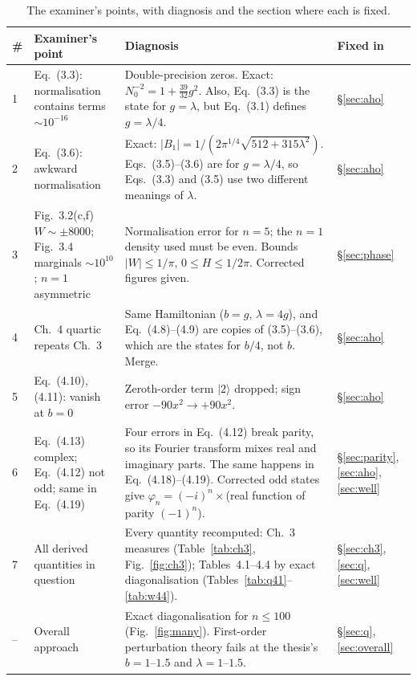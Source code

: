 \documentclass[11pt,a4paper]{article}
\newcommand{\Eq}[1]{Eq.~(#1)}
\newcommand{\ket}[1]{|#1\rangle}
\begin{document}
\begin{table}[h]
\centering\small
\begin{tabular}{@{}p{0.6cm}p{4.6cm}p{6.4cm}p{1.7cm}@{}}
\toprule
\# & Examiner's point & Diagnosis & Fixed in\\
\midrule
1 & \Eq{3.3}: normalisation contains terms $\sim10^{-16}$ &
Double-precision zeros. Exact: $N_0^{-2}=1+\tfrac{39}{32}g^2$. Also, \Eq{3.3} is the state for
$g=\lambda$, but \Eq{3.1} defines $g=\lambda/4$. & \S\ref{sec:aho}\\
2 & \Eq{3.6}: awkward normalisation &
Exact: $|B_1|=1/(2\pi^{1/4}\sqrt{512+315\lambda^2})$. Eqs.~(3.5)--(3.6) are for $g=\lambda/4$, so
Eqs.~(3.3) and (3.5) use two different meanings of $\lambda$. & \S\ref{sec:aho}\\
3 & Fig.~3.2(c,f) $W\sim\pm8000$; Fig.~3.4 marginals $\sim10^{10}$; $n=1$ asymmetric &
Normalisation error for $n=5$; the $n=1$ density used must be even. Bounds $|W|\le1/\pi$,
$0\le H\le1/2\pi$. Corrected figures given. & \S\ref{sec:phase}\\
4 & Ch.~4 quartic repeats Ch.~3 &
Same Hamiltonian ($b=g$, $\lambda=4g$), and \Eq{4.8}--(4.9) are copies of (3.5)--(3.6), which
are the states for $b/4$, not $b$. Merge. & \S\ref{sec:aho}\\
5 & \Eq{4.10}, (4.11): vanish at $b=0$ &
Zeroth-order term $\ket2$ dropped; sign error $-90x^2\to+90x^2$. & \S\ref{sec:aho}\\
6 & \Eq{4.13} complex; \Eq{4.12} not odd; same in \Eq{4.19} &
Four errors in \Eq{4.12} break parity, so its Fourier transform mixes real and imaginary
parts. The same happens in \Eq{4.18}--(4.19). Corrected odd states give
$\varphi_n=(-i)^n\times$(real function of parity $(-1)^n$). & \S\ref{sec:parity},\,\ref{sec:aho},\,\ref{sec:well}\\
7 & All derived quantities in question &
Every quantity recomputed: Ch.~3 measures (Table~\ref{tab:ch3}, Fig.~\ref{fig:ch3});
Tables~4.1--4.4 by exact diagonalisation (Tables~\ref{tab:q41}--\ref{tab:w44}). & \S\ref{sec:ch3},\,\ref{sec:q},\,\ref{sec:well}\\
-- & Overall approach &
Exact diagonalisation for $n\le100$ (Fig.~\ref{fig:many}). First-order perturbation theory
fails at the thesis's $b=1$--$1.5$ and $\lambda=1$--$1.5$. & \S\ref{sec:q},\,\ref{sec:overall}\\
\bottomrule
\end{tabular}
\caption{The examiner's points, with diagnosis and the section where each is fixed.}
\label{tab:summary}
\end{table}
\end{document}
